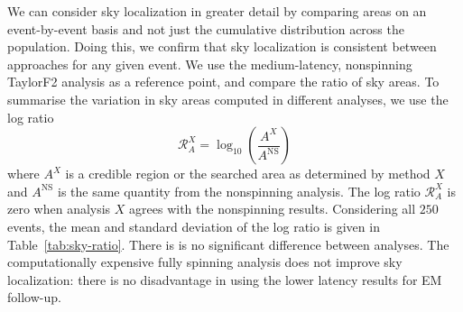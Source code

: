 We can consider sky localization in greater detail by comparing areas on an event-by-event basis and not just the cumulative distribution across the population. Doing this, we confirm that sky localization is consistent between approaches for any given event. We use the medium-latency, nonspinning TaylorF2 analysis as a reference point, and compare the ratio of sky areas. To summarise the variation in sky areas computed in different analyses, we use the log ratio
\begin{equation}
\mathcal{R}_A^X = \log_{10}\left(\frac{A^X}{A^\mathrm{NS}}\right)
\end{equation}
where $A^X$ is a credible region or the searched area as determined by method $X$ and $A^\mathrm{NS}$ is the same quantity from the nonspinning analysis. The log ratio $\mathcal{R}_A^X$ is zero when analysis $X$ agrees with the nonspinning results. Considering all $250$ events, the mean and standard deviation of the log ratio is given in Table~\ref{tab:sky-ratio}. There is is no significant difference between analyses. The computationally expensive fully spinning analysis does not improve sky localization: there is no disadvantage in using the lower latency results for EM follow-up.